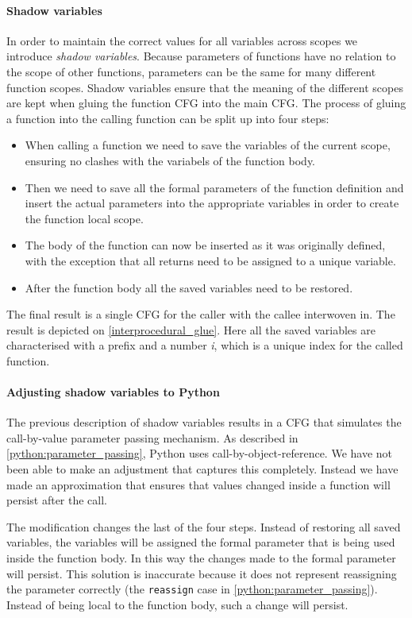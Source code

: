 \paragraph{Shadow variables}
In order to maintain the correct values for all variables across scopes we introduce \emph{shadow variables}.
Because parameters of functions have no relation to the scope of other functions, parameters can be the same for many different function scopes.
Shadow variables ensure that the meaning of the different scopes are kept when gluing the function CFG into the main CFG.
The process of gluing a function into the calling function can be split up into four steps:
\begin{itemize}
\item When calling a function we need to save the variables of the current scope, ensuring no clashes with the variabels of the function body.
\item Then we need to save all the formal parameters of the function definition and insert the actual parameters into the appropriate variables in order to create the function local scope.
\item The body of the function can now be inserted as it was originally defined, with the exception that all returns need to be assigned to a unique variable.
\item After the function body all the saved variables need to be restored.
\end{itemize}

The final result is a single CFG for the caller with the callee interwoven in.
The result is depicted on \cref{interprocedural_glue}.
Here all the saved variables are characterised with a prefix and a number \emph{i}, which is a unique index for the called function.

\paragraph{Adjusting shadow variables to Python}
The previous description of shadow variables results in a CFG that simulates the call-by-value parameter passing mechanism.
As described in \cref{python:parameter_passing}, Python uses call-by-object-reference.
We have not been able to make an adjustment that captures this completely.
Instead we have made an approximation that ensures that values changed inside a function will persist after the call.

The modification changes the last of the four steps.
Instead of restoring all saved variables, the variables will be assigned the formal parameter that is being used inside the function body.
In this way the changes made to the formal parameter will persist.
This solution is inaccurate because it does not represent reassigning the parameter correctly (the \texttt{reassign} case in \cref{python:parameter_passing}).
Instead of being local to the function body, such a change will persist.

